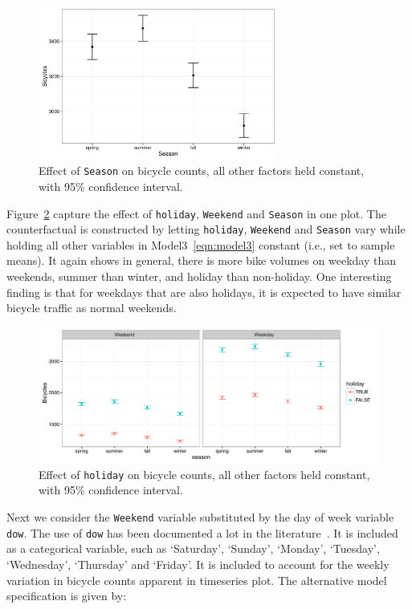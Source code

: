 \documentclass [11pt, proquest] {uwthesis}[2015/03/03]
\begin{document}
\begin{figure}
\centering
  \includegraphics[width=0.7\textwidth]{figures/sim/season} 
 \caption{Effect of \texttt{Season} on bicycle counts, all other factors held constant, with 95\% confidence interval.}
 \label{fig:season}
\end{figure}

Figure~\ref{fig:multi} capture the effect of \texttt{holiday}, \texttt{Weekend} and \texttt{Season} in one plot. The counterfactual is constructed by letting \texttt{holiday}, \texttt{Weekend} and \texttt{Season} vary while holding all other variables in Model3~\eqref{eqn:model3} constant (i.e., set to sample means). It again shows in general, there is more bike volumes on weekday than weekends, summer than winter, and holiday than non-holiday. One interesting finding is that for weekdays that are also holidays, it is expected to have similar bicycle traffic as normal weekends. 


\begin{figure}
\centering
  \includegraphics[width=1\textwidth]{figures/sim/multi} 
 \caption{Effect of \texttt{holiday} on bicycle counts, all other factors held constant, with 95\% confidence interval.}
 \label{fig:multi}
\end{figure}

Next we consider the \texttt{Weekend} variable substituted by the day of week variable \texttt{dow}. The use of \texttt{dow} has been documented a lot in the literature~\cite{Miranda-Moreno:2011aa,Ahmed12}. It is included as a categorical variable, such as `Saturday', `Sunday', `Monday', `Tuesday', `Wednesday', `Thursday' and `Friday'. It is included to account for the weekly variation in bicycle counts apparent in timeseries plot. The alternative model specification is given by:
\end{document}
